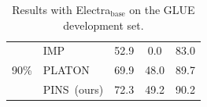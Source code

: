 \begin{table}[h]
\begin{tabular}{c|l|ccc}
		\midrule
		\multirow{3}{*}{90\%}     &IMP                                              &   52.9                                                                                    &0.0                                                                                        &    83.0                                                                                 \\
		& PLATON                                               &  69.9                                                                                    &    48.0                                                                                    &   89.7                                                                                   \\
		&PINS~(ours)                                             &  72.3                                                                                     &     49.2                                                                                  &      90.2                                                                                \\
		\bottomrule                                     
	\end{tabular}
	\caption{Results with Electra$_{\text{base}}$ on the GLUE development set.}
	\label{table:minilm}
\end{table}

